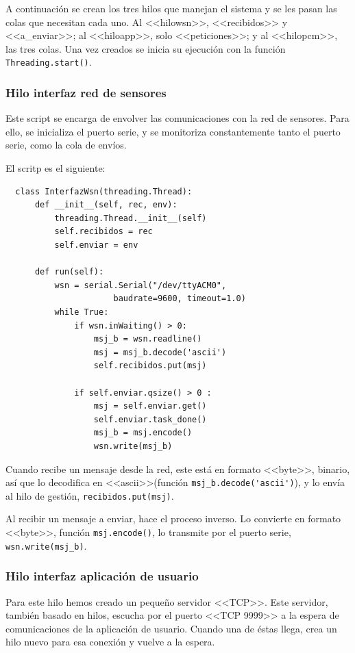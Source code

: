  A continuación se crean los tres hilos que manejan el sistema y se les pasan las colas que necesitan cada uno. Al <<hilowsn>>, <<recibidos>> y <<a\_enviar>>; al <<hiloapp>>, solo <<peticiones>>; y al <<hilopcm>>, las tres colas. Una vez creados se inicia su ejecución con la función \lstinline|Threading.start()|.
 
 \subsubsection{Hilo interfaz red de sensores}
 
 Este script se encarga de envolver las comunicaciones con la red de sensores. Para ello, se inicializa el puerto serie, y se monitoriza constantemente tanto el puerto serie, como la cola de envíos. 
 
 El scritp es el siguiente:
  \begin{lstlisting}
  class InterfazWsn(threading.Thread):
      def __init__(self, rec, env):
          threading.Thread.__init__(self)
          self.recibidos = rec
          self.enviar = env
      
      def run(self):
          wsn = serial.Serial("/dev/ttyACM0", 
                      baudrate=9600, timeout=1.0)
          while True:
              if wsn.inWaiting() > 0:
                  msj_b = wsn.readline()
                  msj = msj_b.decode('ascii')
                  self.recibidos.put(msj)
          
              if self.enviar.qsize() > 0 :
                  msj = self.enviar.get()
                  self.enviar.task_done()
                  msj_b = msj.encode()
                  wsn.write(msj_b)
  \end{lstlisting}
 
 
 Cuando recibe un mensaje desde la red, este está en formato <<byte>>, binario, así que lo decodifica en <<ascii>>(función \lstinline|msj_b.decode('ascii')|), y lo envía al hilo de gestión, \lstinline|recibidos.put(msj)|.
 
  Al recibir un mensaje a enviar, hace el proceso inverso. Lo convierte en formato <<byte>>, función \lstinline|msj.encode()|, lo transmite por el puerto serie, \lstinline|wsn.write(msj_b)|.
  
  
 \subsubsection{Hilo interfaz aplicación de usuario}
 
 Para este hilo hemos creado un pequeño servidor <<TCP>>. Este servidor, también basado en hilos, escucha por el puerto <<TCP 9999>> a la espera de comunicaciones de la aplicación de usuario. Cuando una de éstas llega, crea un hilo nuevo para esa conexión y vuelve a la espera.
 
